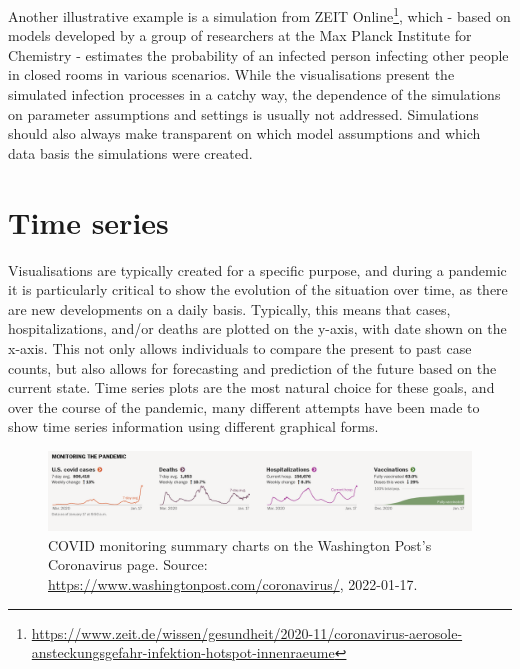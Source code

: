 \documentclass[article]{jdssv}\usepackage[]{graphicx}\usepackage[]{color}
\begin{document}
Another illustrative example is a simulation from ZEIT Online\footnote{\url{https://www.zeit.de/wissen/gesundheit/2020-11/coronavirus-aerosole-ansteckungsgefahr-infektion-hotspot-innenraeume}}, which - based on models developed by a group of researchers at the Max Planck Institute for Chemistry - estimates the probability of an infected person infecting other people in closed rooms in various scenarios. While the visualisations present the simulated infection processes in a catchy way, the dependence of the simulations on parameter assumptions and settings is usually not addressed. Simulations should also always make transparent on which model assumptions and which data basis the simulations were created.


\section{Time series}

Visualisations are typically created for a specific purpose, and during a pandemic it is particularly critical to show the evolution of the situation over time, as there are new developments on a daily basis. Typically, this means that cases, hospitalizations, and/or deaths are plotted on the y-axis, with date shown on the x-axis. This not only allows individuals to compare the present to past case counts, but also allows for forecasting and prediction of the future based on the current state. Time series plots are the most natural choice for these goals, and over the course of the pandemic, many different attempts have been made to show time series information using different graphical forms. 

\begin{figure}
\centering
\includegraphics[width=.99\linewidth]{wapo-covid-monitoring}
\caption{COVID monitoring summary charts on the Washington Post's Coronavirus page. Source: \url{https://www.washingtonpost.com/coronavirus/}, 2022-01-17.}
\label{fig:wapo-covid-time-series}
\end{figure}
\end{document}

